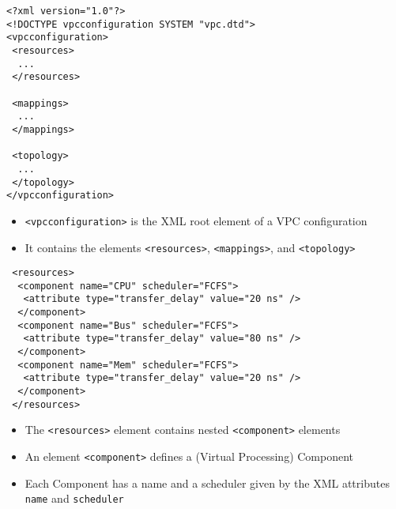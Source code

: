 \begin{frame}[fragile=singleslide]
\begin{lstlisting}
<?xml version="1.0"?>
<!DOCTYPE vpcconfiguration SYSTEM "vpc.dtd">
<vpcconfiguration>
 <resources>
  ...
 </resources>

 <mappings>
  ...
 </mappings>

 <topology>
  ...
 </topology>
</vpcconfiguration>
\end{lstlisting}
\begin{itemize}
\item \lstinline!<vpcconfiguration>! is the XML root element of a VPC configuration
\item It contains the elements \lstinline!<resources>!, \lstinline!<mappings>!, and \lstinline!<topology>!
\end{itemize}
\end{frame}


\begin{frame}[fragile=singleslide]
\begin{lstlisting}
 <resources>
  <component name="CPU" scheduler="FCFS">
   <attribute type="transfer_delay" value="20 ns" />
  </component>
  <component name="Bus" scheduler="FCFS">
   <attribute type="transfer_delay" value="80 ns" />
  </component>
  <component name="Mem" scheduler="FCFS">
   <attribute type="transfer_delay" value="20 ns" />
  </component>
 </resources>
\end{lstlisting}
\begin{itemize}
\item The \lstinline!<resources>! element contains nested \lstinline!<component>! elements
\item An element \lstinline!<component>! defines a (Virtual Processing) Component
\item Each Component has a name and a scheduler given by the XML attributes \lstinline!name! and \lstinline!scheduler!
\end{itemize}
\end{frame}


